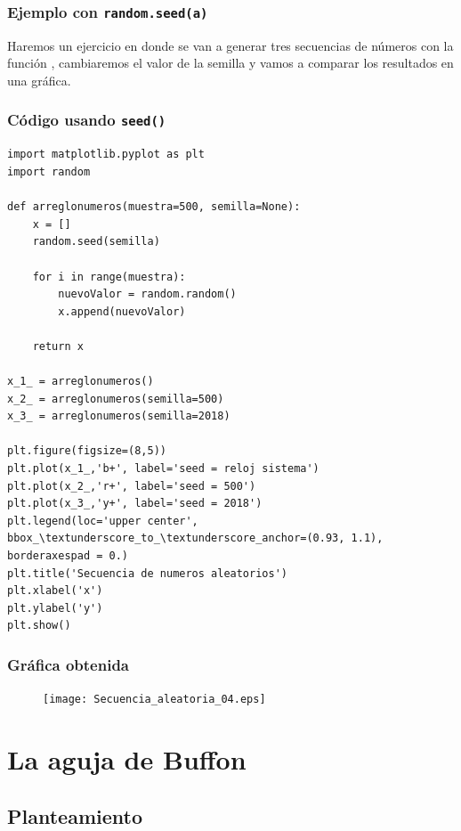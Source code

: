 \documentclass[12pt]{beamer}
\begin{document}
\begin{frame}
\frametitle{Ejemplo con \texttt{random.seed(a)}}
Haremos un ejercicio en donde se van a generar tres secuencias de números con la función , cambiaremos el valor de la semilla y vamos a comparar los resultados en una gráfica.
\end{frame}
\begin{frame}
\frametitle{Código usando \texttt{seed()}}
\begin{lstlisting}[caption=Código con semilla, style=FormattedNumber, basicstyle=\linespread{1.1}\ttfamily=\small, columns=fullflexible]
import matplotlib.pyplot as plt
import random

def arreglonumeros(muestra=500, semilla=None):
    x = []
    random.seed(semilla)
    
    for i in range(muestra):
        nuevoValor = random.random()
        x.append(nuevoValor)
    
    return x

x_1_ = arreglonumeros()
x_2_ = arreglonumeros(semilla=500)
x_3_ = arreglonumeros(semilla=2018)

plt.figure(figsize=(8,5)) 
plt.plot(x_1_,'b+', label='seed = reloj sistema')
plt.plot(x_2_,'r+', label='seed = 500')
plt.plot(x_3_,'y+', label='seed = 2018')
plt.legend(loc='upper center', bbox_\textunderscore_to_\textunderscore_anchor=(0.93, 1.1), borderaxespad = 0.)
plt.title('Secuencia de numeros aleatorios')
plt.xlabel('x')
plt.ylabel('y')
plt.show()
\end{lstlisting}
\end{frame}
\begin{frame}[fragile]
\frametitle{Gráfica obtenida}
\begin{figure}
  \centering
  \texttt{[image: Secuencia\_aleatoria\_04.eps]}
\end{figure}
\end{frame}

\section{La aguja de Buffon}
\subsection{Planteamiento}
\end{document}
